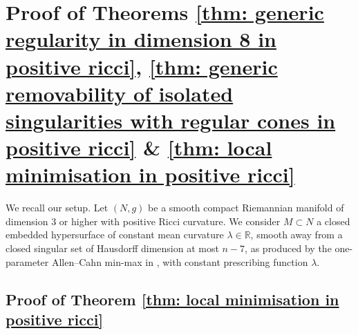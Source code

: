 \documentclass[11pt]{article}
\begin{document}
\section{Proof of Theorems \ref{thm: generic regularity in dimension 8 in positive ricci},  \ref{thm: generic removability of isolated singularities with regular cones in positive ricci} \& \ref{thm: local minimisation in positive ricci}}\label{sec: conclusion of the proof}

We recall our setup. Let $(N,g)$ be a smooth compact Riemannian manifold of dimension $3$ or higher with positive Ricci curvature. We consider $M \subset N$ a closed embedded hypersurface of constant mean curvature $\lambda \in \mathbb{R}$, smooth away from a closed singular set of Hausdorff dimension at most $n-7$, as produced by the one-parameter Allen--Cahn min-max in \cite{bellettini-wickramasekera}, with constant prescribing function $\lambda$. 

\subsection{Proof of Theorem \ref{thm: local minimisation in positive ricci}}\label{subsec: proof of theorem 3}
\end{document}
